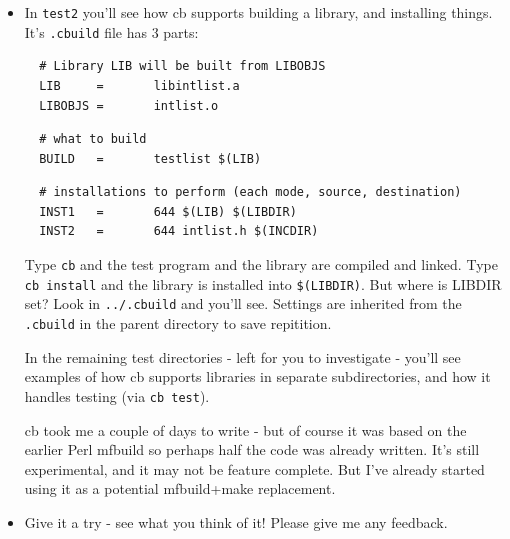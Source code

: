 \documentclass[aspectratio=169]{beamer}
\begin{document}
\begin{frame}[fragile]
  \begin{itemize}

  \item
  In \verb+test2+ you'll see how \alert{cb} supports building a library,
  and installing things.  It's \verb+.cbuild+ file has 3 parts:

\tiny
\begin{verbatim}
  # Library LIB will be built from LIBOBJS
  LIB     =       libintlist.a
  LIBOBJS =       intlist.o
\end{verbatim}

\pause
\begin{verbatim}
  # what to build
  BUILD   =       testlist $(LIB)
\end{verbatim}

\pause
\begin{verbatim}
  # installations to perform (each mode, source, destination)
  INST1   =       644 $(LIB) $(LIBDIR)
  INST2   =       644 intlist.h $(INCDIR)
\end{verbatim}
\small

  \pitem
  Type \verb+cb+ and the test program and the library are compiled
  and linked.  Type \verb+cb install+ and the library is installed
  into \verb+$(LIBDIR)+.  But where is LIBDIR set?  Look in
  \verb+../.cbuild+ and you'll see.  Settings are inherited from
  the \verb+.cbuild+ in the parent directory to save repitition.

  \pitem
  In the remaining test directories - left for you to investigate -
  you'll see examples of how \alert{cb} supports libraries in separate
  subdirectories,
  and how it handles testing (via \verb+cb test+).

  \pitem
  \alert{cb} took me a couple of days to write - but of course it was
  based on the earlier Perl \alert{mfbuild} so perhaps half the code
  was already written.  It's still experimental, and it may not be
  feature complete.  But I've already started using it
  as a potential \alert{mfbuild+make} replacement.
  
  \item
  Give it a try - see what you think of it!  Please give me any feedback.

  \end{itemize}
\end{frame}
\end{document}
